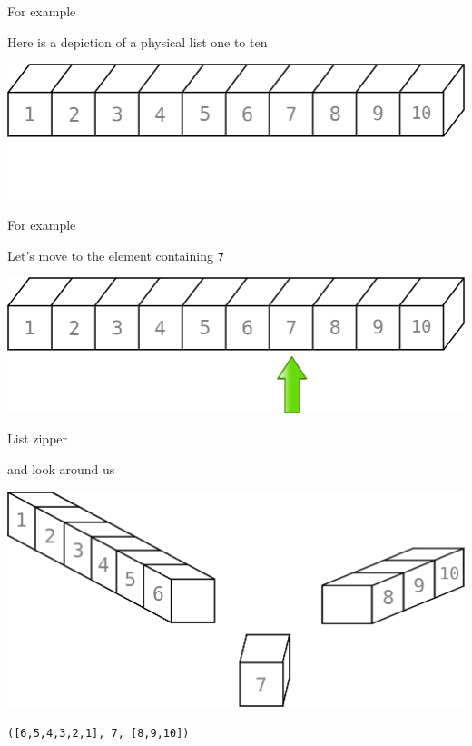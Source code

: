 \begin{frame}
\begin{block}{For example}
\begin{center}
Here is a depiction of a physical list one to ten
\end{center}
\end{block}
\begin{center}
\includegraphics[width=1.25\textheight]{image/list1-10.png}
\end{center}
\end{frame}

\begin{frame}
\begin{block}{For example}
\begin{center}
Let's move to the element containing \lstinline{7}
\end{center}
\end{block}
\begin{center}
\includegraphics[width=1.25\textheight]{image/list1-10-arrow7.png}
\end{center}
\end{frame}

\begin{frame}
\begin{block}{List zipper}
\begin{center}
and look around us
\end{center}
\end{block}
\begin{center}
\includegraphics[width=1.25\textheight]{image/listzipper1-10.png}
\end{center}
\begin{center}
\lstinline{([6,5,4,3,2,1], 7, [8,9,10])}
\end{center}
\end{frame}

